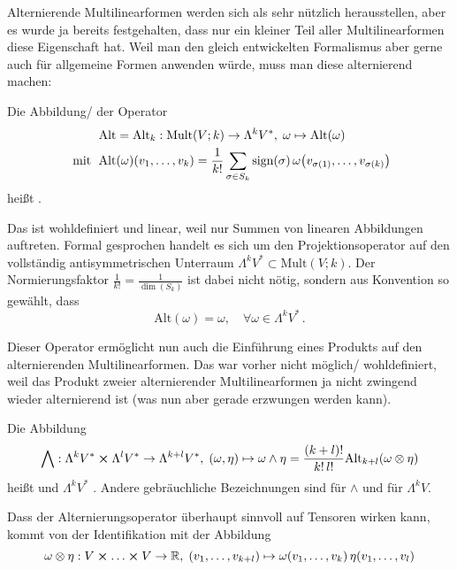 \documentclass[../H_Analysis_main.tex]{subfiles}
\begin{document}
Alternierende Multilinearformen werden sich als sehr nützlich herausstellen, aber es wurde ja bereits festgehalten, dass nur ein kleiner Teil aller Multilinearformen diese Eigenschaft hat. Weil man den gleich entwickelten Formalismus aber gerne auch für allgemeine Formen anwenden würde, muss man diese alternierend machen:
\begin{defi}[Alternierungsoperator]
Die Abbildung/ der Operator
\begin{equation}
\begin{split}
&\text{Alt} = \text{Alt}_k: \text{Mult}(V; k) \rightarrow \Lambda^k V^*, \; \omega \mapsto \text{Alt}(\omega) 
\\
\text{ mit } \; &\text{Alt}(\omega)(v_1, \dots, v_k) = \frac{1}{k!} \sum_{\sigma \in S_k} \text{sign}(\sigma) \, \omega\qty(v_{\sigma(1)}, \dots, v_{\sigma(k)})
\end{split}
\end{equation}
heißt .
\end{defi}
Das ist wohldefiniert und linear, weil nur Summen von linearen Abbildungen auftreten. Formal gesprochen handelt es sich um den Projektionsoperator auf den vollständig antisymmetrischen Unterraum $\Lambda^k V^* \subset \text{Mult}(V; k)$. Der Normierungsfaktor $\frac{1}{k!} = \frac{1}{\dim(S_k)}$ ist dabei nicht nötig, sondern aus Konvention so gewählt, dass
\begin{equation}
\text{Alt}(\omega) = \omega, \quad \forall \omega \in \Lambda^k V^* \, .
\end{equation}

Dieser Operator ermöglicht nun auch die Einführung eines Produkts auf den alternierenden Multilinearformen. Das war vorher nicht möglich/ wohldefiniert, weil das Produkt zweier alternierender Multilinearformen ja nicht zwingend wieder alternierend ist (was nun aber gerade erzwungen werden kann).

\begin{defi}[Dachprodukt]
Die Abbildung
\begin{equation}
\bigwedge: \Lambda^k V^* \cross \Lambda^l V^* \rightarrow \Lambda^{k + l} V^*, \; (\omega, \eta) \mapsto \omega \wedge \eta = \frac{(k + l)!}{k! \, l!} \text{Alt}_{k + l} \qty(\omega \otimes \eta)
\end{equation}
heißt  und $\Lambda^k V^*$ . Andere gebräuchliche Bezeichnungen sind  für $\wedge$ und  für $\Lambda^k V$.
\end{defi}
Dass der Alternierungsoperator überhaupt sinnvoll auf Tensoren wirken kann, kommt von der Identifikation mit der Abbildung
\begin{equation*}
\omega \otimes \eta: V \cross \dots \cross V \rightarrow \mathbb{R}, \; (v_1, \dots, v_{k + l}) \mapsto \omega(v_1, \dots, v_k) \, \eta(v_1, \dots, v_l)%
\end{equation*}
\end{document}
